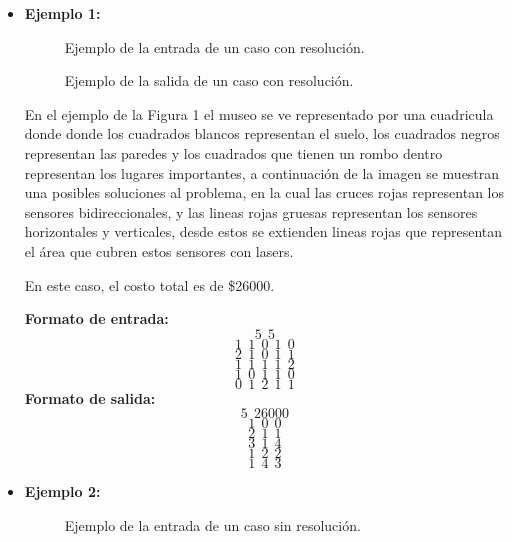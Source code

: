 \begin{itemize}
\item {\large{\textbf{Ejemplo 1:}}}

\begin{figure}[H] %
\hfill
\begin{minipage}[t]{.45\textwidth}
\begin{center}
\caption{Ejemplo de la entrada de un caso con resolución.}
\label{fig-tc1}
\end{center}
\end{minipage}
\hfill
\begin{minipage}[t]{.45\textwidth}
\begin{center}
\caption{Ejemplo de la salida de un caso con resolución.}
\label{fig-tc2}
\end{center}
\end{minipage}
\hfill
\end{figure}

En el ejemplo de la Figura 1 el museo se ve representado por una cuadricula donde donde los cuadrados blancos representan el suelo, los cuadrados negros representan las paredes y los cuadrados que tienen un rombo dentro representan los lugares importantes, a continuación de la imagen se muestran una posibles soluciones al problema, en la cual las cruces rojas representan los sensores bidireccionales, y las lineas rojas gruesas representan los sensores horizontales y verticales, desde estos se extienden lineas rojas que representan el área que cubren estos sensores con lasers.

En este caso, el costo total es de \$26000.

\textbf{Formato de entrada:} 
$$5\ \ 5$$
$$1\ \ 1\ \ 0\ \ 1\ \ 0$$
$$2\ \ 1\ \ 0\ \ 1\ \ 1$$
$$1\ \ 1\ \ 1\ \ 1\ \ 2$$
$$1\ \ 0\ \ 1\ \ 1\ \ 0$$
$$0\ \ 1\ \ 2\ \ 1\ \ 1$$
\textbf{Formato de salida:} 
$$5\ \ 26000$$
$$1\ \ 0\ \ 0$$
$$2\ \ 1\ \ 1$$
$$3\ \ 1\ \ 4$$
$$1\ \ 2\ \ 2$$
$$1\ \ 4\ \ 3$$

\newline

\item {\large{\textbf{Ejemplo 2:}}}

\begin{center}
\begin{figure}[H] %
\begin{minipage}[t]{.45\textwidth}
\begin{center}
\caption{Ejemplo de la entrada de un caso sin resolución.}
\end{center}
\label{fig-tc1}
\end{minipage}
\end{figure}
\end{center}


\end{itemize}

